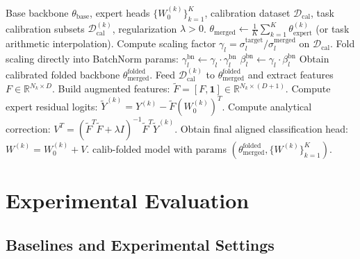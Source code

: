 \documentclass{article}
\theoremstyle{plain}
\theoremstyle{definition}
\theoremstyle{remark}
\begin{document}
\begin{algorithm}[tb]
   \caption{The WFC-PR-LSHA Joint Calibration Protocol}
   \label{alg:wfc_pr_lsha}
\begin{algorithmic}[1]
    Base backbone $\theta_{\text{base}}$, expert heads $\{W_0^{(k)}\}_{k=1}^K$, calibration dataset $\mathcal{D}_{\text{cal}}$, task calibration subsets $\mathcal{D}_{\text{cal}}^{(k)}$, regularization $\lambda > 0$.
   \STATE $\theta_{\text{merged}} \leftarrow \frac{1}{K}\sum_{k=1}^K \theta_{\text{expert}}^{(k)}$ (or task arithmetic interpolation).
   \STATE Compute scaling factor $\gamma_l = \sigma_l^{\text{target}} / \sigma_l^{\text{merged}}$ on $\mathcal{D}_{\text{cal}}$.
   \STATE Fold scaling directly into BatchNorm params:
   \STATE $\gamma_l^{\text{bn}} \leftarrow \gamma_l \cdot \gamma_l^{\text{bn}}$
   \STATE $\beta_l^{\text{bn}} \leftarrow \gamma_l \cdot \beta_l^{\text{bn}}$
   \ENDFOR
   \STATE Obtain calibrated folded backbone $\theta_{\text{merged}}^{\text{folded}}$.
   \STATE Feed $\mathcal{D}_{\text{cal}}^{(k)}$ to $\theta_{\text{merged}}^{\text{folded}}$ and extract features $F \in \mathbb{R}^{N_k \times D}$.
   \STATE Build augmented features: $\tilde{F} = [F, \mathbf{1}] \in \mathbb{R}^{N_k \times (D+1)}$.
   \STATE Compute expert residual logits: $\tilde{Y}^{(k)} = Y^{(k)} - \tilde{F}(W_0^{(k)})^T$.
   \STATE Compute analytical correction:
   \STATE $V^T = (\tilde{F}^T \tilde{F} + \lambda I)^{-1} \tilde{F}^T \tilde{Y}^{(k)}$.
   \STATE Obtain final aligned classification head: $W^{(k)} = W_0^{(k)} + V$.
   \ENDFOR
    calib-folded model with params $(\theta_{\text{merged}}^{\text{folded}}, \{W^{(k)}\}_{k=1}^K)$.
\end{algorithmic}
\end{algorithm}

\section{Experimental Evaluation}
\label{sec:experiments}

\subsection{Baselines and Experimental Settings}
\label{sec:settings}
\end{document}
